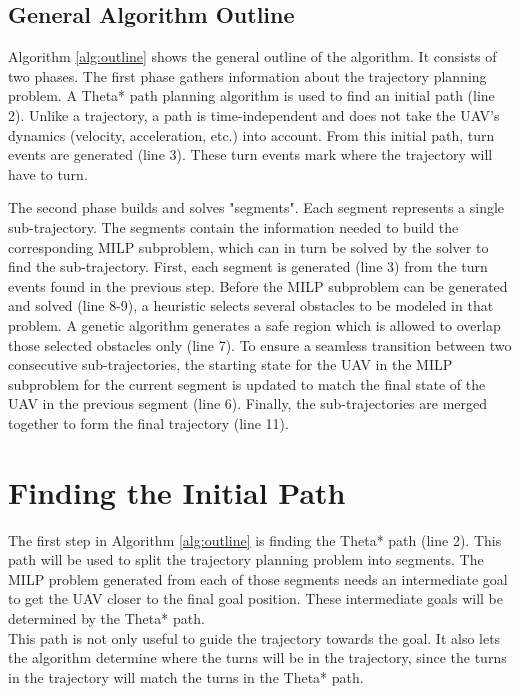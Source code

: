 \subsection{General Algorithm Outline}
Algorithm \ref{alg:outline} shows the general outline of the algorithm. It consists of two phases. The first phase gathers information about the trajectory planning problem. A Theta* path planning algorithm is used to find an initial path (line 2). Unlike a trajectory, a path is time-independent and does not take the UAV's dynamics (velocity, acceleration, etc.) into account. From this initial path, turn events are generated (line 3). These turn events mark where the trajectory will have to turn.
\par
The second phase builds and solves "segments". Each segment represents a single sub-trajectory. The segments contain the information needed to build the corresponding MILP subproblem, which can in turn be solved by the solver to find the sub-trajectory. First, each segment is generated (line 3) from the turn events found in the previous step. Before the MILP subproblem can be generated and solved (line 8-9), a heuristic selects several obstacles to be modeled in that problem. A genetic algorithm generates a safe region which is allowed to overlap those selected obstacles only (line 7). To ensure a seamless transition between two consecutive sub-trajectories, the starting state for the UAV in the MILP subproblem for the current segment is updated to match the final state of the UAV in the previous segment (line 6). Finally, the sub-trajectories are merged together to form the final trajectory (line 11).

\section{Finding the Initial Path}
\label{subsec:initial-path}
The first step in Algorithm \ref{alg:outline} is finding the Theta* path (line 2). This path will be used to split the trajectory planning problem into segments. The MILP problem generated from each of those segments needs an intermediate goal to get the UAV closer to the final goal position. These intermediate goals will be determined by the Theta* path. \\
This path is not only useful to guide the trajectory towards the goal. It also lets the algorithm determine where the turns will be in the trajectory, since the turns in the trajectory will match the turns in the Theta* path.

